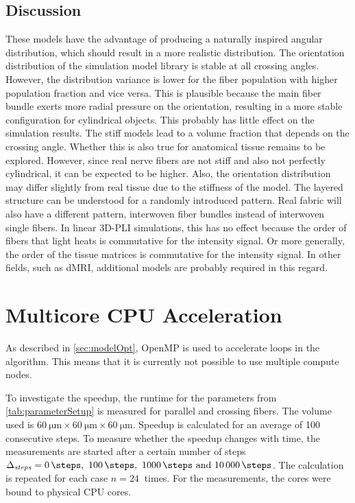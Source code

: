 \subsection{Discussion}
% 
These models have the advantage of producing a naturally inspired angular distribution, which should result in a more realistic distribution.
The orientation distribution of the simulation model library is stable at all crossing angles.
However, the distribution variance is lower for the fiber population with higher population fraction and vice versa.
This is plausible because the main fiber bundle exerts more radial pressure on the orientation, resulting in a more stable configuration for cylindrical objects.
This probably has little effect on the simulation results.
The stiff models lead to a volume fraction that depends on the crossing angle.
Whether this is also true for anatomical tissue remains to be explored.
However, since real nerve fibers are not stiff and also not perfectly cylindrical, it can be expected to be higher.
Also, the orientation distribution may differ slightly from real tissue due to the stiffness of the model.
The layered structure can be understood for a randomly introduced pattern.
Real fabric will also have a different pattern, \eg{} interwoven fiber bundles instead of interwoven single fibers.
In linear \ac{3D-PLI} simulations, this has no effect because the order of fibers that light heats is commutative for the intensity signal.
Or more generally, the order of the tissue matrices is commutative for the intensity signal.
In other fields, such as \ac{dMRI}, additional models are probably required in this regard.
% 
%
%
\section{Multicore CPU Acceleration}
%
As described in \cref{sec:modelOpt}, \ac{OpenMP} is used to accelerate  loops in the algorithm.
This means that it is currently not possible to use multiple compute nodes.
\par
% 
To investigate the speedup, the runtime for the parameters from \cref{tab:parameterSetup} is measured for parallel and crossing fibers.
The volume used is $\SI{60}{\micro\meter} \times \SI{60}{\micro\meter} \times \SI{60}{\micro\meter}$.
Speedup is calculated for an average of 100 consecutive steps.
To measure whether the speedup changes with time, the measurements are started after a certain number of steps $\Delta_{\mathit{steps}} = \SIlist{0;100;1000;10000}{\steps}$.
The calculation is repeated for each case $n=\SI{24}{}$ times.
For the measurements, the cores were bound to physical CPU cores.
%
% 
% 
